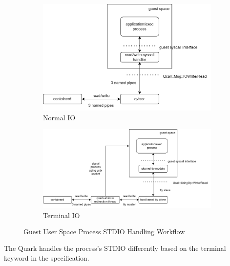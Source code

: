 \begin{figure}[ht] 
    \begin{subfigure}[b]{0.5\linewidth}
      \centering
      \includegraphics[width=0.9\linewidth]{images/normorl_io.png} 
      \caption{Normal IO} 
      \label{fig1:a} 
      \vspace{4ex}
    \end{subfigure}%
    \begin{subfigure}[b]{0.5\linewidth}
      \centering
      \includegraphics[width=0.9\linewidth]{images/termianl_workflow.png} 
      \caption{Terminal IO} 
      \label{fig1:b} 
      \vspace{4ex}
    \end{subfigure} 
    \caption{Guest User Space Process STDIO Handling Workflow}
    \label{fig1} 
\end{figure}


The Quark handles the process’s STDIO differently based on the terminal keyword in the specification. 
 

